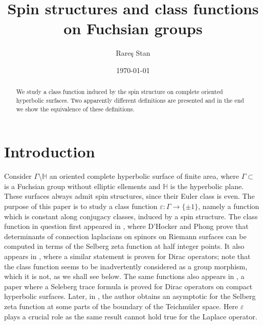 \documentclass[12pt]{amsart}
\theoremstyle{definition}
\def\HH{{\mathbb{H}}}
\def\G{{\Gamma}}
\DeclareMathOperator{\psl}{PSL_2(\mathbb{R})}
\begin{document}
\title[Spin structures and class functions on Fuchsian groups]{Spin structures and class functions on Fuchsian groups}
\author{Rare\c s Stan}
\address{Institute of Mathematics of the Romanian Academy\\ 
Bucharest\\ 
Romania}

\begin{abstract}
We study a class function induced by the spin structure on complete oriented hyperbolic surfaces. Two apparently different definitions are presented and in the end we show the equivalence of these definitions.
\end{abstract}

\date{\today}
\maketitle

\section{Introduction}
Consider $\G\setminus \HH$ an oriented complete hyperbolic surface of finite area, where $\G\subset \psl$ is a Fuchsian group without elliptic ellements and $\HH$ is the hyperbolic plane. These surfaces always admit spin structures, since their Euler class is even. The purpose of this paper is to study a class function $\varepsilon: \G \longrightarrow \{ \pm 1 \}$, namely a function which is constant along conjugacy classes, induced by a spin structure. The class function in question first appeared in \cite{dhockerPhong}, where D'Hocker and Phong prove that determinants of connection laplacians on spinors on Riemann surfaces can be computed in terms of the Selberg zeta function at half integer points. It also appears in \cite{SarnckDeterminantsOfLaplacians}, where a similar statement is proven for Dirac operators; note  that the class function seems to be inadvertently considered as a group morphism, which it is not, as we shall see below. The same functions also appears in \cite{BolteStiepanSelbergForDirac}, a paper where a Seleberg trace formula is proved for Dirac operators on compact hyperbolic surfaces. Later, in \cite{rares}, the author obtains an asymptotic for the Selberg zeta function at some parts of the boundary of the Teichm\" uler space. Here $\varepsilon$ plays a crucial role as the same result cannot hold true for the Laplace operator.
\end{document}
